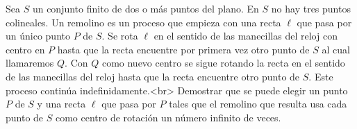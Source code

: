 Sea $S$ un conjunto finito de dos o más puntos del plano. En $S$ no hay tres puntos colineales. Un remolino es un proceso que empieza con una recta $\ell$ que pasa por un único punto $P$ de $S$. Se rota $\ell$ en el sentido de las manecillas del reloj con centro en $P$ hasta que la recta encuentre por primera vez otro punto de $S$ al cual llamaremos $Q$. Con $Q$ como nuevo centro se sigue rotando la recta en el sentido de las manecillas del reloj hasta que la recta encuentre otro punto de $S$. Este proceso continúa indefinidamente.<br>
Demostrar que se puede elegir un punto $P$ de $S$ y una recta $\ell$ que pasa por $P$ tales que el remolino que resulta usa cada punto de $S$ como centro de rotación un número infinito de veces.